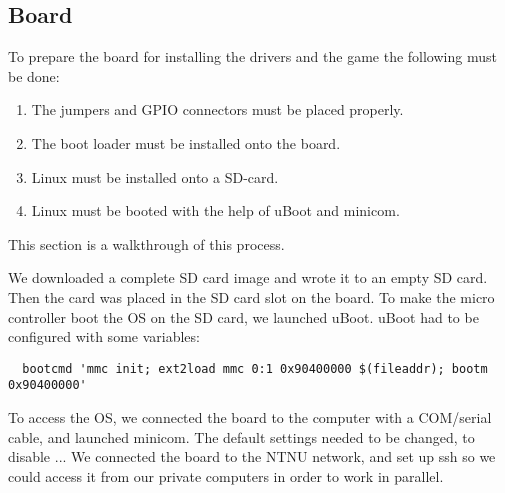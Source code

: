 \subsection{Board}

To prepare the board for installing the drivers and the game the following must be done:
\begin{enumerate}
  \item The jumpers and GPIO connectors must be placed properly.
  \item The boot loader must be installed onto the board.
  \item Linux must be installed onto a SD-card.
  \item Linux must be booted with the help of uBoot and minicom.
\end{enumerate}


This section is a walkthrough of this process.

We downloaded a complete SD card image and wrote it to an empty SD card. Then the card was placed in the SD card slot on the board. To make the micro controller boot the OS on the SD card, we launched uBoot. uBoot had to be configured with some variables:
\begin{verbatim}
  bootcmd 'mmc init; ext2load mmc 0:1 0x90400000 $(fileaddr); bootm 0x90400000'
\end{verbatim}


To access the OS, we connected the board to the computer with a COM/serial cable, and launched minicom. The default settings needed to be changed, to disable ...
We connected the board to the NTNU network, and set up ssh so we could access it from our private computers in order to work in parallel.
